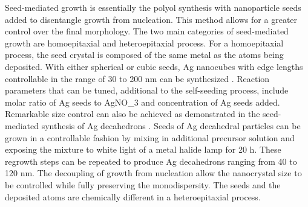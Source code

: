 Seed-mediated growth is essentially the polyol synthesis with nanoparticle seeds added to disentangle growth from nucleation.
This method allows for a greater control over the final morphology.
The two main categories of seed-mediated growth are homoepitaxial and heteroepitaxial process.
For a homoepitaxial process, the seed crystal is composed of the same metal as the atoms being deposited.
With either spherical or cubic seeds, Ag nanocubes with edge lengths controllable in the range of 30 to 200 nm can be synthesized \cite{Zhang_2010}.
Reaction parameters that can be tuned, additional to the self-seeding process, include molar ratio of Ag seeds to AgNO_3 and concentration of Ag seeds added.
Remarkable size control can also be achieved as demonstrated in the seed-mediated synthesis of Ag decahedrons \cite{Pietrobon_2008}.
Seeds of Ag decahedral particles can be grown in a controllable fashion by mixing in additional precursor solution and exposing the mixture to white light of a metal halide lamp for 20 h.
These regrowth steps can be repeated to produce Ag decahedrons ranging from 40 to 120 nm.
The decoupling of growth from nucleation allow the nanocrystal size to be controlled while fully preserving the monodispersity.
The seeds and the deposited atoms are chemically different in a heteroepitaxial process.


  
  
  
  
  
  
  
  
  
  
  
  
  
  
  
  
  